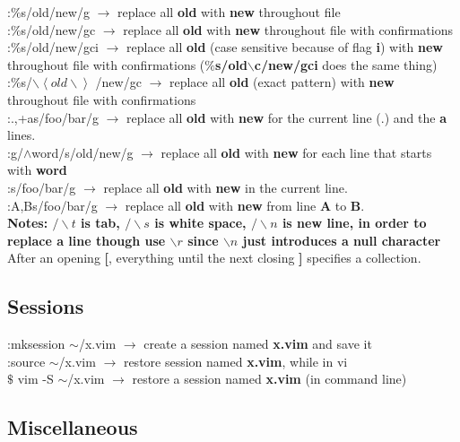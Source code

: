 \documentclass[twoside,a4paper]{article}
\newcommand{\tcg}{\color{gray}} \newcommand{\tco}{\color{orange}} \newcommand{\tcp}{\color{purple}}
\newcommand{\tck}{\color{black}}
\newcommand{\ra }{$\rightarrow$ }
\begin{document}
\begin{multicols}{2}
    \tcr :$\%$s/old/new/g \tck $\rightarrow$ replace all \textbf{old} with \textbf{new} throughout
    file\\
    \tcr :$\%$s/old/new/gc \tck $\rightarrow$ replace all \textbf{old} with \textbf{new} throughout
    file with confirmations\\
    \tcr :$\%$s/old/new/gci \tck $\rightarrow$ replace all \textbf{old} (case sensitive because of
    flag \textbf{i}) with \textbf{new} throughout file with confirmations
    (\textbf{$\%$s/old$\backslash$c/new/gci} does the same thing)\\
    \tcr :$\%$s/$\backslash\left< old \backslash \right>$ /new/gc \tck \ra replace all \textbf{old}
        (exact pattern) with \textbf{new} throughout file with confirmations\\
    \tcr :.,+as/foo/bar/g \tck $\rightarrow$ replace all \textbf{old} with \textbf{new} for the
    current line (.) and the \textbf{a} lines.\\
    \tcr :g/$\wedge$word/s/old/new/g \tck \ra replace all \textbf{old} with \textbf{new} for each
    line that starts with \textbf{word}\\
    \tcr :s/foo/bar/g \tck \ra replace all \textbf{old} with \textbf{new} in the current line.\\
    \tcr :A,Bs/foo/bar/g \tck $\rightarrow$ replace all \textbf{old} with \textbf{new} from line
    \textbf{A} to \textbf{B}.\\
    \tcg \textbf{Notes: $/\backslash t$ is tab, $/\backslash s$ is white space, $/\backslash n$ is
        new line, in order to replace a line though use $\backslash r$ since $\backslash n$ just
        introduces a null character}\\
    After an opening \textbf{[}, everything until the next closing \textbf{]} specifies a
    collection.

    \tcc \subsection{Sessions}

    \tcr :mksession $\sim$/x.vim \tck \ra create a session named \textbf{x.vim} and save it\\
    \tcr :source $\sim$/x.vim \tck \ra restore session named \textbf{x.vim}, while in vi\\
    \tcr $\$ $ vim -S $\sim$/x.vim \tck $\rightarrow$ restore a session named \textbf{x.vim} (in
    command line)

    \tcc \subsection{Miscellaneous}


\end{multicols}
\end{document}
